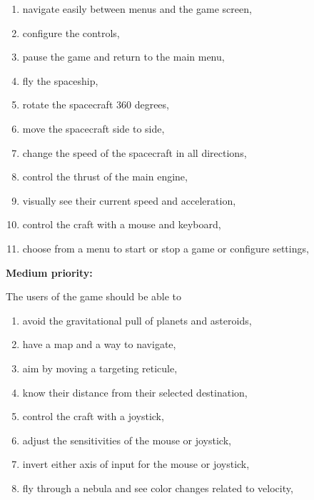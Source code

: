\begin{multicols}{2}
\begin{enumerate}

  \item navigate easily between menus and the game screen,

  \item configure the controls,

  \item pause the game and return to the main menu,

  \item fly the spaceship,

  \item rotate the spacecraft 360 degrees,

  \item move the spacecraft side to side,

  \item change the speed of the spacecraft in all directions, 

  \item control the thrust of the main engine,

  \item visually see their current speed and acceleration,

  \item control the craft with a mouse and keyboard,

  \item choose from a menu to start or stop a game or configure settings,

\end{enumerate}
\end{multicols}

\noindent \textbf{Medium priority:}

The users of the game should be able to

\begin{multicols}{2}
\begin{enumerate}

  \item avoid the gravitational pull of planets and asteroids, 

  \item have a map and a way to navigate,

  \item aim by moving a targeting reticule,

  \item know their distance from their selected destination,

  \item control the craft with a joystick,

  \item adjust the sensitivities of the mouse or joystick,

  \item invert either axis of input for the mouse or joystick,

  \item fly through a nebula and see color changes related to velocity,

\end{enumerate}
\end{multicols}

